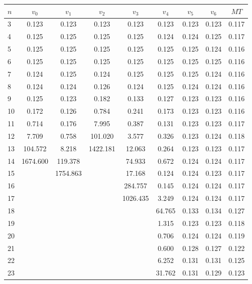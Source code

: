 \begin{table}[H]
  \centering
  \begin{tabular}{|l|c|c|c|c|c|c|c|c|}
    \hline
    $n$ & $v_0$ & $v_1$ & $v_2$ & $v_3$ & $v_4$ & $v_5$ & $v_6$ & $MT$ \\
    \hline
          3 & 0.123 & 0.123 & 0.123 & 0.123 & 0.123 & 0.123 & 0.123 & 0.117 \\
          4 & 0.125 & 0.125 & 0.125 & 0.125 & 0.124 & 0.124 & 0.125 & 0.117 \\
          5 & 0.125 & 0.125 & 0.125 & 0.125 & 0.125 & 0.125 & 0.124 & 0.116 \\
          6 & 0.125 & 0.125 & 0.125 & 0.125 & 0.125 & 0.125 & 0.125 & 0.116 \\
          7 & 0.124 & 0.125 & 0.124 & 0.125 & 0.125 & 0.125 & 0.124 & 0.116 \\
          8 & 0.124 & 0.124 & 0.126 & 0.124 & 0.125 & 0.124 & 0.124 & 0.116 \\
          9 & 0.125 & 0.123 & 0.182 & 0.133 & 0.127 & 0.123 & 0.123 & 0.116 \\
          10 & 0.172 & 0.126 & 0.784 & 0.241 & 0.173 & 0.123 & 0.123 & 0.116 \\
          11 & 0.714 & 0.176 & 7.995 & 0.387 & 0.131 & 0.123 & 0.123 & 0.117 \\
          12 & 7.709 & 0.758 & 101.020 & 3.577 & 0.326 & 0.123 & 0.124 & 0.118 \\
          13 & 104.572 & 8.218 & 1422.181 & 12.063 & 0.264 & 0.123 & 0.123 & 0.117 \\
          14 & 1674.600 & 119.378 & & 74.933 & 0.672 & 0.124 & 0.124 & 0.117 \\
          15 & & 1754.863 & & 17.168 & 0.124 & 0.124 & 0.123 & 0.117 \\
          16 & & & & 284.757 & 0.145 & 0.124 & 0.124 & 0.117 \\
          17 & & & & 1026.435 & 3.249 & 0.124 & 0.124 & 0.117 \\
          18 & & & & & 64.765 & 0.133 & 0.134 & 0.127 \\
          19 & & & & & 1.315 & 0.123 & 0.123 & 0.118 \\
          20 & & & & & 0.706 & 0.124 & 0.124 & 0.119 \\
          21 & & & & & 0.600 & 0.128 & 0.127 & 0.122 \\
          22 & & & & & 6.252 & 0.131 & 0.131 & 0.125 \\
          23 & & & & & 31.762 & 0.131 & 0.129 & 0.123 \\

\end{tabular}
\end{table}
